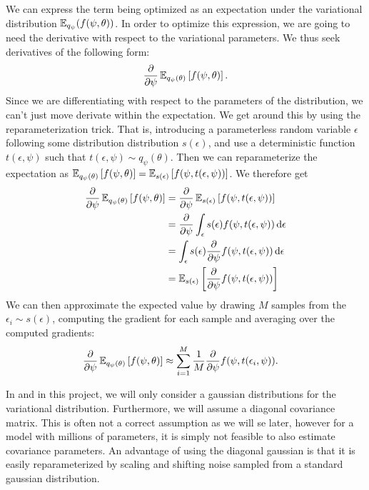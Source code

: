 We can express the term being optimized as an expectation under the variational distribution $\operatorname{\mathbb{E}}_{q_{\psi}}(f(\psi, \theta))$.
In order to optimize this expression, we are going to need the derivative with respect to the variational parameters.
We thus seek derivatives of the following form:
\begin{align}
    \pdv{\psi} \operatorname{\mathbb{E}}_{q_\psi(\theta)}\left[ f(\psi, \theta) \right].
\end{align}
Since we are differentiating with respect to the parameters of the distribution, we can't just move derivate within the expectation.
We get around this by using the reparameterization trick.
That is, introducing a parameterless random variable $\epsilon$ following some distribution distribution $s(\epsilon)$, and use a deterministic function $t(\epsilon, \psi)$ such that $t(\epsilon, \psi) \sim q_\psi(\theta)$.
Then we can reparameterize the expectation as
$ \operatorname{\mathbb{E}}_{q_\psi(\theta)}\left[ f(\psi, \theta) \right] = \operatorname{\mathbb{E}}_{s(\epsilon)}\left[ f(\psi, t(\epsilon, \psi)) \right]$.
We therefore get
\begin{equation}
    \begin{aligned}
        \pdv{\psi} \operatorname{\mathbb{E}}_{q_\psi(\theta)}\left[ f(\psi, \theta) \right] &= \pdv{\psi}\operatorname{\mathbb{E}}_{s(\epsilon)}\left[ f(\psi, t(\epsilon, \psi)) \right] \\
        &= \pdv{\psi} \int_\epsilon s(\epsilon) f(\psi, t(\epsilon, \psi))\dd{\epsilon}\\
        &= \int_\epsilon s(\epsilon) \pdv{\psi} f(\psi, t(\epsilon, \psi)) \dd{\epsilon}\\
        &= \operatorname{\mathbb{E}}_{s(\epsilon)} \left[ \pdv{\psi} f(\psi, t(\epsilon, \psi)) \right]
    \end{aligned}
\end{equation}
We can then approximate the expected value by drawing $M$ samples from the $\epsilon_i\sim s(\epsilon)$, computing the gradient for each sample and averaging over the computed gradients:
\begin{equation} 
    \begin{aligned}
        \pdv{\psi} \operatorname{\mathbb{E}}_{q_\psi(\theta)}\left[ f(\psi, \theta) \right] &\approx \sum_{i=1}^{M} \frac{1}{M} \pdv{\psi} f(\psi, t(\epsilon_i, \psi)).  
    \end{aligned}
\end{equation}

In \cite{blundell_weight_2015} and in this project, we will only consider a gaussian distributions for the variational distribution.
Furthermore, we will assume a diagonal covariance matrix. 
This is often not a correct assumption as we will se later, however for a model with millions of parameters, it is simply not feasible to also estimate covariance parameters. 
An advantage of using the diagonal gaussian is that it is easily reparameterized by scaling and shifting noise sampled from a standard gaussian distribution.

